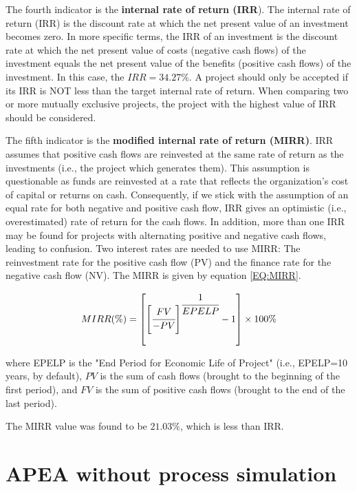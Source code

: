 	The fourth indicator is the \textbf{internal rate of return (IRR}). The internal rate of return (IRR) is the discount rate at which the net present value of an investment becomes zero. In more specific terms, the IRR of an investment is the discount rate at	which the net present value of costs (negative cash flows) of the investment equals the net present value of the benefits (positive cash flows) of the investment. In this case, the $IRR = 34.27\%$. A project should only be accepted if its IRR is NOT less than the target internal rate of return. When comparing two or more mutually exclusive projects, the project with the highest value of IRR should be considered.

	The fifth indicator is the \textbf{modified internal rate of return (MIRR)}. IRR assumes that positive cash flows are reinvested at the same rate of return as the investments (i.e., the project which generates them). This assumption is questionable as funds are reinvested at a rate that reflects the organization’s cost of capital or returns on cash. Consequently, if we stick with the assumption of an equal rate for both negative and positive cash flow, IRR gives an optimistic (i.e., overestimated) rate of return for the cash flows. In addition, more than one IRR may be found for projects with alternating positive and negative cash flows, leading to confusion. Two interest rates are needed to use MIRR: The reinvestment rate for the positive cash flow (PV) and the finance rate for the negative cash flow (NV). The MIRR is given by equation \ref{EQ:MIRR}.

	\begin{equation}
		MIRR(\%) = \left[ \left[ \cfrac{FV}{-PV} \right]^{\cfrac{1}{EPELP}} -1 \right] \times 100\%
		\label{EQ:MIRR}
	\end{equation}

	where EPELP is the "End Period for Economic Life of Project" (i.e., EPELP=10 years, by default), $PV$ is the sum of cash flows (brought to the beginning of the first period), and $FV$ is the sum of positive cash flows (brought to the end of the last period).
	
	The MIRR value was found to be $21.03\%$, which is less than IRR.

	\section{APEA without process simulation}
	

